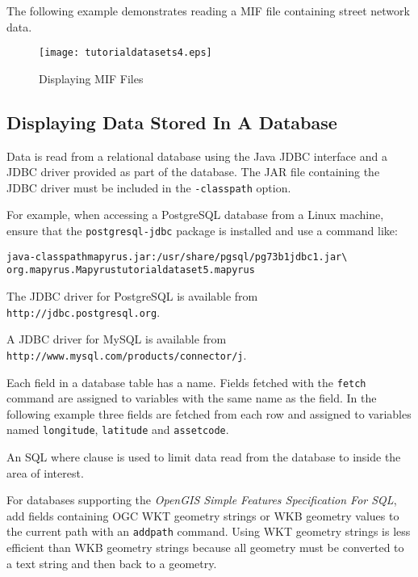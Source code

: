 The following example demonstrates reading a MIF file containing
street network data.



\begin{figure}[htb]
\texttt{[image: tutorialdatasets4.eps]}
\caption{Displaying MIF Files}
\label{tutorialdatasets4}
\end{figure}

\subsection{Displaying Data Stored In A Database}

Data is read from a relational database using
the Java JDBC interface and a JDBC driver provided
as part of the database.  The JAR file containing the
JDBC driver must be included in the \texttt{-classpath} option.

For example, when accessing a PostgreSQL database from a Linux
machine, ensure that the \texttt{postgresql-jdbc} package is
installed and use a command like:

\begin{alltt}
java -classpath mapyrus.jar:/usr/share/pgsql/pg73b1jdbc1.jar \textbackslash
  org.mapyrus.Mapyrus tutorialdataset5.mapyrus
\end{alltt}

The JDBC driver for PostgreSQL is available from
\texttt{http://jdbc.postgresql.org}.

A JDBC driver for MySQL is available from
\newline
\texttt{http://www.mysql.com/products/connector/j}.

Each field in a database table has a name.
Fields fetched with the
\texttt{fetch}
command are assigned to variables with the same name as the field.
In the following example three fields are fetched from each
row and assigned to variables named
\texttt{longitude}, \texttt{latitude} and \texttt{assetcode}.

An SQL where clause is used to limit data read from
the database to inside the area of interest.



For databases supporting the \textit{OpenGIS Simple Features Specification For
SQL}, add fields containing OGC WKT geometry strings or WKB geometry values
to the current path with an \texttt{addpath} command.  Using WKT geometry
strings is less efficient than WKB geometry strings because all geometry
must be converted to a text string and then back to a geometry.

